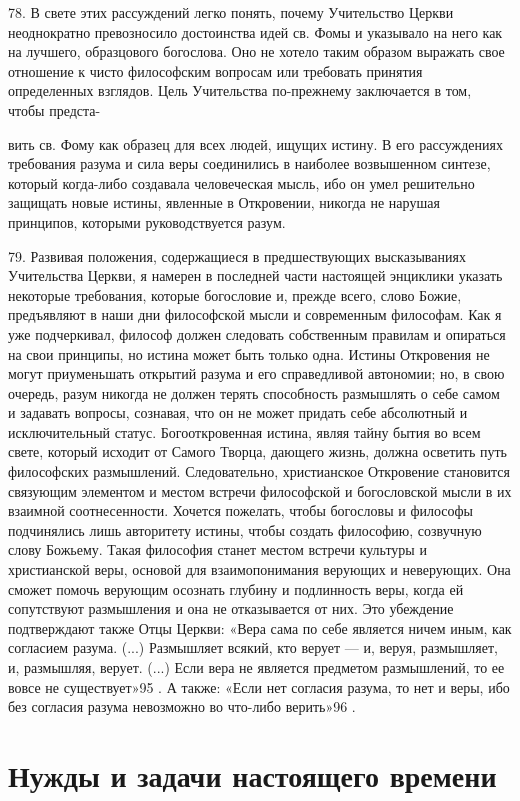 \documentclass[a5paper,10pt]{article}
\begin{document}
78. В свете этих рассуждений легко понять, почему Учительство Церкви
неоднократно превозносило достоинства идей св. Фомы и указывало на него как на
лучшего, образцового богослова. Оно не хотело таким образом выражать свое
отношение к чисто философским вопросам или требовать принятия определенных
взглядов. Цель Учительства по-прежнему заключается в том, чтобы предста-

вить св. Фому как образец для всех людей, ищущих истину. В его рассуждениях
требования разума и сила веры соединились в наиболее возвышенном синтезе,
который когда-либо создавала человеческая мысль, ибо он умел решительно
защищать новые истины, явленные в Откровении, никогда не нарушая принципов,
которыми руководствуется разум.

79. Развивая положения, содержащиеся в предшествующих высказываниях Учительства
Церкви, я намерен в последней части настоящей энциклики указать некоторые
требования, которые богословие и, прежде всего, слово Божие, предъявляют в наши
дни философской мысли и современным философам. Как я уже подчеркивал, философ
должен следовать собственным правилам и опираться на свои принципы, но истина
может быть только одна. Истины Откровения не могут приуменьшать открытий разума
и его справедливой автономии; но, в свою очередь, разум никогда не должен
терять способность размышлять о себе самом и задавать вопросы, сознавая, что он
не может придать себе абсолютный и исключительный статус. Богооткровенная
истина, являя тайну бытия во всем свете, который исходит от Самого Творца,
дающего жизнь, должна осветить путь философских размышлений. Следовательно,
христианское Откровение становится связующим элементом и местом встречи
философской и богословской мысли в их взаимной соотнесенности. Хочется
пожелать, чтобы богословы и философы подчинялись лишь авторитету истины, чтобы
создать философию, созвучную слову Божьему. Такая философия станет местом
встречи культуры и христианской веры, основой для взаимопонимания верующих и
неверующих. Она сможет помочь верующим осознать глубину и подлинность веры,
когда ей сопутствуют размышления и она не отказывается от них. Это убеждение
подтверждают также Отцы Церкви: «Вера сама по себе является ничем иным, как
согласием разума. (...) Размышляет всякий, кто верует — и, веруя, размышляет,
и, размышляя, верует. (...) Если вера не является предметом размышлений, то ее
вовсе не существует»95 . А также: «Если нет согласия разума, то нет и веры, ибо
без согласия разума невозможно во что-либо верить»96 .

\section{Нужды и задачи настоящего времени}
\end{document}
